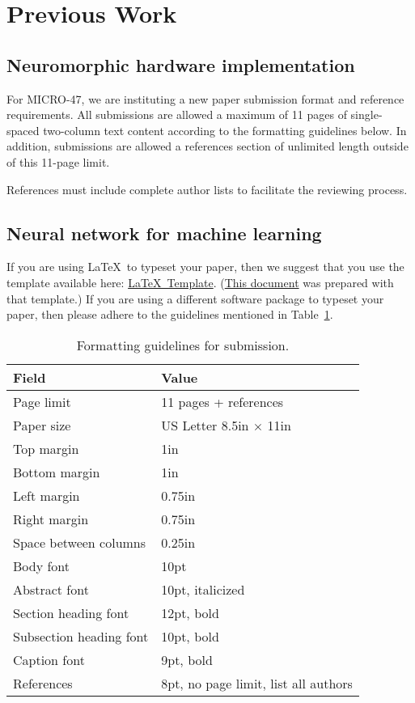 \documentclass[pageno]{jpaper}
\begin{document}
\section{Previous Work}


\subsection{Neuromorphic hardware implementation}

For MICRO-47, we are instituting a new paper submission format
and reference requirements. All submissions are allowed a maximum 
of 11 pages of single-spaced two-column text content according to
the formatting guidelines below.  In addition, submissions are 
allowed a references section of unlimited length outside of this
11-page limit.  

References must include complete author lists to facilitate
the reviewing process.	

\subsection{Neural network for machine learning} 

If you are using \LaTeX~to typeset your paper, then we suggest
that you use the template available here:
\href{http://www.microarch.org/micro47/files/micro47-latex-template.tar.gz}{\LaTeX~Template}.
(\href{http://www.microarch.org/micro47/files/micro47-template.pdf}{This
document} was prepared with that template.)  If you are using a different
software package to typeset your paper, then please adhere to the guidelines
mentioned in Table~\ref{table:formatting}.

\begin{table}[h!]
  \centering
  \begin{tabular}{|l|l|}
    \hline
    \textbf{Field} & \textbf{Value}\\
    \hline
    \hline
    Page limit & 11 pages + references\\
    \hline
    Paper size & US Letter 8.5in $\times$ 11in\\
    \hline
    Top margin & 1in\\
    \hline
    Bottom margin & 1in\\
    \hline
    Left margin & 0.75in\\
    \hline
    Right margin & 0.75in\\
    \hline
    Space between columns & 0.25in\\
    \hline
    Body font & 10pt\\
    \hline
    Abstract font & 10pt, italicized\\
    \hline
    Section heading font & 12pt, bold\\
    \hline
    Subsection heading font & 10pt, bold\\
    \hline
    Caption font & 9pt, bold\\
    \hline
    References & 8pt, no page limit, list all authors\\
    \hline
  \end{tabular}
  \caption{Formatting guidelines for submission.}
  \label{table:formatting}
\end{table}
\end{document}
